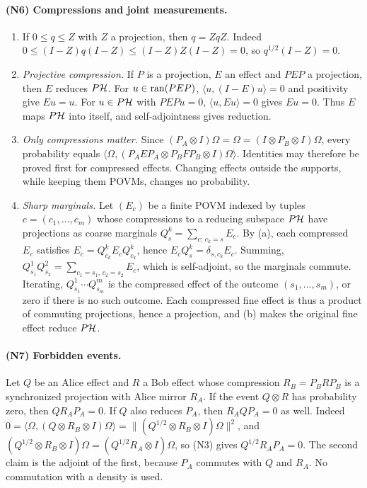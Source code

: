 \paragraph{(N6) Compressions and joint measurements.}
\begin{enumerate}[label=(\alph*)]
\item If $0\leq q\leq Z$ with $Z$ a projection, then $q=ZqZ$. Indeed $0\leq(I-Z)q(I-Z)\leq(I-Z)Z(I-Z)=0$, so $q^{1/2}(I-Z)=0$.
\item \emph{Projective compression.} If $P$ is a projection, $E$ an effect and $PEP$ a projection, then $E$ reduces $P\mathcal H$. For $u\in\operatorname{ran}(PEP)$, $\langle u,(I-E)u\rangle=0$ and positivity give $Eu=u$. For $u\in P\mathcal H$ with $PEPu=0$, $\langle u,Eu\rangle=0$ gives $Eu=0$. Thus $E$ maps $P\mathcal H$ into itself, and self-adjointness gives reduction.
\item \emph{Only compressions matter.} Since $(P_A\otimes I)\Omega=\Omega=(I\otimes P_B\otimes I)\Omega$, every probability equals $\langle\Omega,(P_AEP_A\otimes P_BFP_B\otimes I)\Omega\rangle$. Identities may therefore be proved first for compressed effects. Changing effects outside the supports, while keeping them POVMs, changes no probability.
\item \emph{Sharp marginals.} Let $(E_c)$ be a finite POVM indexed by tuples $c=(c_1,\ldots,c_m)$ whose compressions to a reducing subspace $P\mathcal H$ have projections as coarse marginals $Q^k_s=\sum_{c:\,c_k=s}E_c$. By (a), each compressed $E_c$ satisfies $E_c=Q^k_{c_k}E_cQ^k_{c_k}$, hence $E_cQ^k_s=\delta_{s,c_k}E_c$. Summing, $Q^1_{s_1}Q^2_{s_2}=\sum_{c_1=s_1,\,c_2=s_2}E_c$, which is self-adjoint, so the marginals commute. Iterating, $Q^1_{s_1}\cdots Q^m_{s_m}$ is the compressed effect of the outcome $(s_1,\ldots,s_m)$, or zero if there is no such outcome. Each compressed fine effect is thus a product of commuting projections, hence a projection, and (b) makes the original fine effect reduce $P\mathcal H$.
\end{enumerate}

\paragraph{(N7) Forbidden events.}
Let $Q$ be an Alice effect and $R$ a Bob effect whose compression $R_B=P_BRP_B$ is a synchronized projection with Alice mirror $R_A$. If the event $Q\otimes R$ has probability zero, then $QR_AP_A=0$. If $Q$ also reduces $P_A$, then $R_AQP_A=0$ as well. Indeed $0=\langle\Omega,(Q\otimes R_B\otimes I)\Omega\rangle=\|(Q^{1/2}\otimes R_B\otimes I)\Omega\|^2$, and $(Q^{1/2}\otimes R_B\otimes I)\Omega=(Q^{1/2}R_A\otimes I)\Omega$, so (N3) gives $Q^{1/2}R_AP_A=0$. The second claim is the adjoint of the first, because $P_A$ commutes with $Q$ and $R_A$. No commutation with a density is used.

